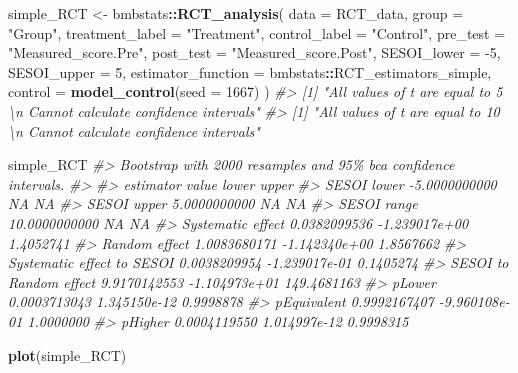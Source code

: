 \documentclass[
]{book}
\newenvironment{Shaded}{\begin{snugshade}}{\end{snugshade}}
\newcommand{\CommentTok}[1]{\textcolor[rgb]{0.56,0.35,0.01}{\textit{#1}}}
\newcommand{\DataTypeTok}[1]{\textcolor[rgb]{0.13,0.29,0.53}{#1}}
\newcommand{\DecValTok}[1]{\textcolor[rgb]{0.00,0.00,0.81}{#1}}
\newcommand{\KeywordTok}[1]{\textcolor[rgb]{0.13,0.29,0.53}{\textbf{#1}}}
\newcommand{\NormalTok}[1]{#1}
\newcommand{\OperatorTok}[1]{\textcolor[rgb]{0.81,0.36,0.00}{\textbf{#1}}}
\newcommand{\StringTok}[1]{\textcolor[rgb]{0.31,0.60,0.02}{#1}}
\begin{document}
\begin{Shaded}
\begin{Highlighting}[]
\NormalTok{simple\_RCT <{-}}\StringTok{ }\NormalTok{bmbstats}\OperatorTok{::}\KeywordTok{RCT\_analysis}\NormalTok{(}
  \DataTypeTok{data =}\NormalTok{ RCT\_data,}
  \DataTypeTok{group =} \StringTok{"Group"}\NormalTok{,}
  \DataTypeTok{treatment\_label =} \StringTok{"Treatment"}\NormalTok{,}
  \DataTypeTok{control\_label =} \StringTok{"Control"}\NormalTok{,}
  \DataTypeTok{pre\_test =} \StringTok{"Measured\_score.Pre"}\NormalTok{,}
  \DataTypeTok{post\_test =} \StringTok{"Measured\_score.Post"}\NormalTok{,}
  \DataTypeTok{SESOI\_lower =} \DecValTok{{-}5}\NormalTok{,}
  \DataTypeTok{SESOI\_upper =} \DecValTok{5}\NormalTok{,}
  \DataTypeTok{estimator\_function =}\NormalTok{ bmbstats}\OperatorTok{::}\NormalTok{RCT\_estimators\_simple,}
  \DataTypeTok{control =} \KeywordTok{model\_control}\NormalTok{(}\DataTypeTok{seed =} \DecValTok{1667}\NormalTok{)}
\NormalTok{)}
\CommentTok{\#> [1] "All values of t are equal to  5 \textbackslash{}n Cannot calculate confidence intervals"}
\CommentTok{\#> [1] "All values of t are equal to  10 \textbackslash{}n Cannot calculate confidence intervals"}


\NormalTok{simple\_RCT}
\CommentTok{\#> Bootstrap with 2000 resamples and 95\% bca confidence intervals.}
\CommentTok{\#> }
\CommentTok{\#>                   estimator         value         lower       upper}
\CommentTok{\#>                 SESOI lower {-}5.0000000000            NA          NA}
\CommentTok{\#>                 SESOI upper  5.0000000000            NA          NA}
\CommentTok{\#>                 SESOI range 10.0000000000            NA          NA}
\CommentTok{\#>           Systematic effect  0.0382099536 {-}1.239017e+00   1.4052741}
\CommentTok{\#>               Random effect  1.0083680171 {-}1.142340e+00   1.8567662}
\CommentTok{\#>  Systematic effect to SESOI  0.0038209954 {-}1.239017e{-}01   0.1405274}
\CommentTok{\#>      SESOI to Random effect  9.9170142553 {-}1.104973e+01 149.4681163}
\CommentTok{\#>                      pLower  0.0003713043  1.345150e{-}12   0.9998878}
\CommentTok{\#>                 pEquivalent  0.9992167407 {-}9.960108e{-}01   1.0000000}
\CommentTok{\#>                     pHigher  0.0004119550  1.014997e{-}12   0.9998315}
\end{Highlighting}
\end{Shaded}

\begin{Shaded}
\begin{Highlighting}[]
\KeywordTok{plot}\NormalTok{(simple\_RCT)}
\end{Highlighting}
\end{Shaded}
\end{document}
